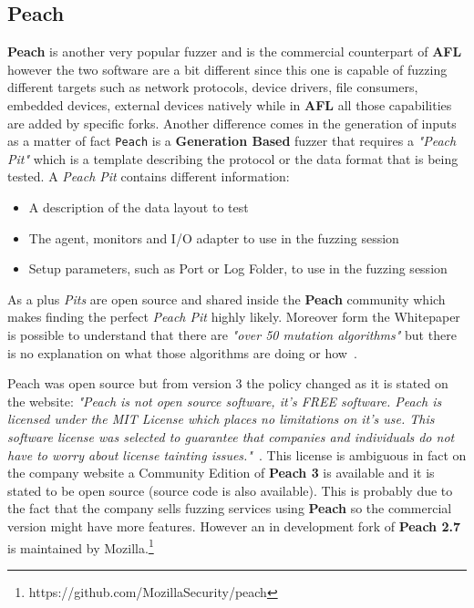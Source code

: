 \documentclass[../main.tex]{subfiles}
\begin{document}
\subsection{Peach}

\textbf{Peach} is another very popular fuzzer and is the commercial counterpart of \textbf{AFL} however the two software are a bit different since this one is capable of fuzzing different targets such as network protocols, device drivers, file consumers, embedded devices, external devices natively while in \textbf{AFL} all those capabilities are added by specific forks. Another difference comes in the generation of inputs as a matter of fact \texttt{Peach} is a \textbf{Generation Based} fuzzer that requires a \textit{"Peach Pit"} which is a template describing the protocol or the data format that is being tested.
A \textit{Peach Pit} contains different information:
\begin{itemize}
  \item A description of the data layout to test
  \item The agent, monitors and I/O adapter to use in the fuzzing session
  \item Setup parameters, such as Port or Log Folder, to use in the fuzzing session
\end{itemize}
As a plus \textit{Pits} are open source and shared inside the \textbf{Peach} community which makes finding the perfect \textit{Peach Pit} highly likely. Moreover form the Whitepaper is possible to understand that there are \textit{"over 50 mutation algorithms"} but there is no explanation on what those algorithms are doing or how~\cite{peach}.

Peach was open source but from version 3 the policy changed as it is stated on the website: \textit{"Peach is not open source software, it’s FREE software. Peach is licensed under the MIT License which places no limitations on it’s use. This software license was selected to guarantee that companies and individuals do not have to worry about license tainting issues."}~\cite{peachlicense}. This license is ambiguous in fact on the company website a Community Edition of \textbf{Peach 3} is available and it is stated to be open source (source code is also available). This is probably due to the fact that the company sells fuzzing services using \textbf{Peach} so the commercial version might have more features. However an in development fork of \textbf{Peach 2.7} is maintained by Mozilla.\footnote{https://github.com/MozillaSecurity/peach}
\end{document}
